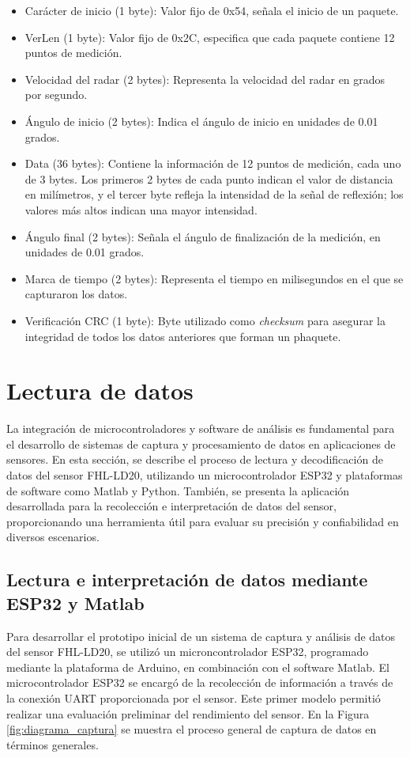 \begin{itemize}
	\item  Carácter de inicio (1 byte): Valor fijo de 0x54, señala el inicio de un paquete.
	\item  VerLen (1 byte): Valor fijo de 0x2C, especifica que cada paquete contiene 12 puntos de medición.
	\item  Velocidad del radar (2 bytes): Representa la velocidad del radar en grados por segundo.
	\item  Ángulo de inicio (2 bytes): Indica el ángulo de inicio en unidades de 0.01 grados.
	\item  Data (36 bytes): Contiene la información de 12 puntos de medición, cada uno de 3 bytes. Los primeros 2 bytes de cada punto indican el valor de distancia en milímetros, y el tercer byte refleja la intensidad de la señal de reflexión; los valores más altos indican una mayor intensidad.
	\item  Ángulo final (2 bytes): Señala el ángulo de finalización de la medición, en unidades de 0.01 grados.
	\item  Marca de tiempo (2 bytes): Representa el tiempo en milisegundos en el que se capturaron los datos.
	\item  Verificación CRC (1 byte):  Byte utilizado como \textit{checksum} para asegurar la integridad de todos los datos anteriores que forman un phaquete.
\end{itemize}

\section{Lectura de datos}
La integración de microcontroladores y software de análisis es fundamental para el desarrollo de sistemas de captura y procesamiento de datos en aplicaciones de sensores. En esta sección, se describe el proceso de lectura y decodificación de datos del sensor FHL-LD20, utilizando un microcontrolador ESP32 y plataformas de software como Matlab y Python. También, se presenta la aplicación desarrollada para la recolección e interpretación de datos del sensor, proporcionando una herramienta útil para evaluar su precisión y confiabilidad en diversos escenarios.

\subsection{Lectura e interpretación de datos mediante ESP32 y Matlab}
Para desarrollar el prototipo inicial de un sistema de captura y análisis de datos del sensor FHL-LD20, se utilizó un microncontrolador ESP32, programado mediante la plataforma de Arduino, en combinación con el software Matlab. El microcontrolador ESP32 se encargó de la recolección de información a través de la conexión UART proporcionada por el sensor. Este primer modelo permitió realizar una evaluación preliminar del rendimiento del sensor. En la Figura \ref{fig:diagrama_captura} se muestra el proceso general de captura de datos en términos generales.


